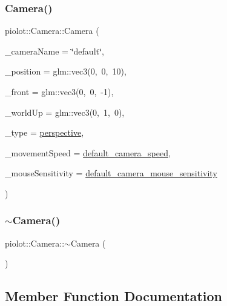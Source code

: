 \subsubsection{\texorpdfstring{Camera()}{Camera()}}
{\footnotesize\ttfamily piolot\+::\+Camera\+::\+Camera (\begin{DoxyParamCaption}\item[{std\+::string}]{\+\_\+camera\+Name = {\ttfamily \char`\"{}default\char`\"{}},  }\item[{glm\+::vec3}]{\+\_\+position = {\ttfamily glm\+:\+:vec3(0,~0,~10)},  }\item[{glm\+::vec3}]{\+\_\+front = {\ttfamily glm\+:\+:vec3(0,~0,~-\/1)},  }\item[{glm\+::vec3}]{\+\_\+world\+Up = {\ttfamily glm\+:\+:vec3(0,~1,~0)},  }\item[{\mbox{\hyperlink{namespacepiolot_a8ffac0a73d973fb66879963da5defc90}{Camera\+Type}}}]{\+\_\+type = {\ttfamily \mbox{\hyperlink{namespacepiolot_a8ffac0a73d973fb66879963da5defc90a2306e17263193ee4e70fe9756faef528}{perspective}}},  }\item[{float}]{\+\_\+movement\+Speed = {\ttfamily \mbox{\hyperlink{namespacepiolot_ad09978d4f33e2559089adbc964c31992}{default\+\_\+camera\+\_\+speed}}},  }\item[{float}]{\+\_\+mouse\+Sensitivity = {\ttfamily \mbox{\hyperlink{namespacepiolot_a748a31cf105e50f2a20ccaba5fd374d3}{default\+\_\+camera\+\_\+mouse\+\_\+sensitivity}}} }\end{DoxyParamCaption})\hspace{0.3cm}{\ttfamily [inline]}}

\mbox{\label{classpiolot_1_1_camera_a0d693a4be11bfc98a2cb46c4363ed00f}} 
\subsubsection{\texorpdfstring{$\sim$\+Camera()}{~Camera()}}
{\footnotesize\ttfamily piolot\+::\+Camera\+::$\sim$\+Camera (\begin{DoxyParamCaption}{ }\end{DoxyParamCaption})\hspace{0.3cm}{\ttfamily [default]}}



\subsection{Member Function Documentation}
\mbox{\label{classpiolot_1_1_camera_aa9172dabf1f037963c8f93f7b774cd9e}} 
